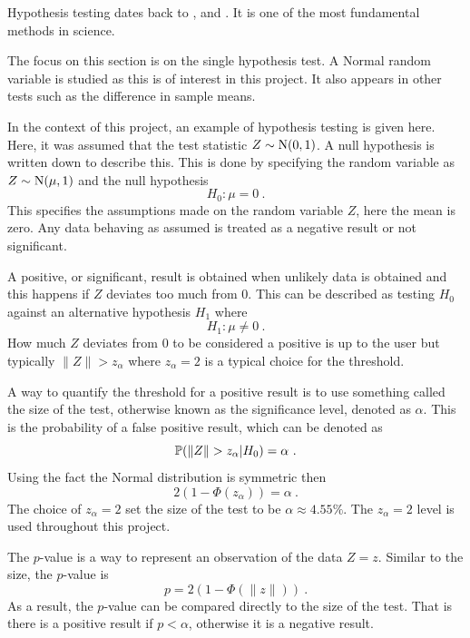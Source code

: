 Hypothesis testing dates back to \cite{pearson1900on}, \cite{neyman1933on} and \cite{fisher1970statistical}. It is one of the most fundamental methods in science.

The focus on this section is on the single hypothesis test. A Normal random variable is studied as this is of interest in this project. It also appears in other tests such as the difference in sample means.

In the context of this project, an example of hypothesis testing is given here. Here, it was assumed that the test statistic $Z\sim\operatorname{N}(0,1)$. A null hypothesis is written down to describe this. This is done by specifying the random variable as $Z\sim\operatorname{N}(\mu,1)$ and the null hypothesis
\begin{equation}
    H_0:\mu=0 \ .
\end{equation}
This specifies the assumptions made on the random variable $Z$, here the mean is zero. Any data behaving as assumed is treated as a negative result or not significant.

A positive, or significant, result is obtained when unlikely data is obtained and this happens if $Z$ deviates too much from 0. This can be described as testing $H_0$ against an alternative hypothesis $H_1$ where
\begin{equation}
    H_1:\mu\neq0 \ .
\end{equation}
How much $Z$ deviates from 0 to be considered a positive is up to the user but typically $\|Z\|>z_\alpha$ where $z_\alpha =2$ is a typical choice for the threshold.

A way to quantify the threshold for a positive result is to use something called the size of the test, otherwise known as the significance level, denoted as $\alpha$. This is the probability of a false positive result, which can be denoted as
\begin{equation}
    \prob(\|Z\|>z_\alpha|H_0) = \alpha \ .
\end{equation}
Using the fact the Normal distribution is symmetric then
\begin{equation}
    2(1 - \Phi(z_\alpha)) = \alpha \ .
    \label{eq:inference_single_alpha}
\end{equation}
The choice of $z_\alpha=2$ set the size of the test to be $\alpha\approx 4.55\%$. The $z_\alpha=2$ level is used throughout this project.

The $p$-value is a way to represent an observation of the data $Z=z$. Similar to the size, the $p$-value is
\begin{equation}
    p=2(1-\Phi(\|z\|)) \ .
\end{equation}
As a result, the $p$-value can be compared directly to the size of the test. That is there is a positive result if $p<\alpha$, otherwise it is a negative result.

